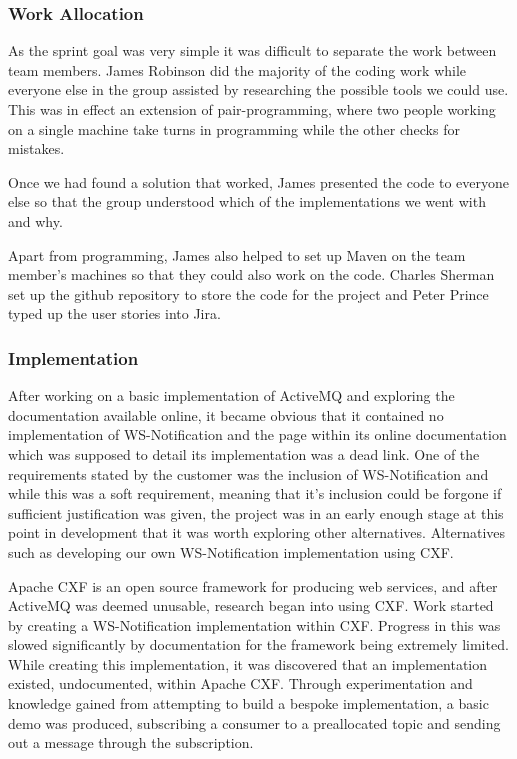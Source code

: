 \documentclass[a4paper, 12pt]{article}
\begin{document}
\subsubsection{Work Allocation}

As the sprint goal was very simple it was difficult to separate the work between team members. James Robinson did the majority of the coding work while everyone else in the group assisted by researching the possible tools we could use. This was in effect an extension of pair-programming, where two people working on a single machine take turns in programming while the other checks for mistakes.

Once we had found a solution that worked, James presented the code to everyone else so that the group understood which of the implementations we went with and why.

Apart from programming, James also helped to set up Maven on the team member's machines so that they could also work on the code. Charles Sherman set up the github repository to store the code for the project and Peter Prince typed up the user stories into Jira.

\subsubsection{Implementation}

After working on a basic implementation of ActiveMQ and exploring the documentation available online, it became obvious that it contained no implementation of WS-Notification and the page within its online documentation which was supposed to detail its implementation was a dead link. One of the requirements stated by the customer was the inclusion of WS-Notification and while this was a soft requirement, meaning that it's inclusion could be forgone if sufficient justification was given, the project was in an early enough stage at this point in development that it was worth exploring other alternatives. Alternatives such as developing our own WS-Notification implementation using CXF.

Apache CXF is an open source framework for producing web services, and after ActiveMQ was deemed unusable, research began into using CXF. Work started by creating a WS-Notification implementation within CXF. Progress in this was slowed significantly by documentation for the framework being extremely limited. While creating this implementation, it was discovered that an implementation existed, undocumented, within Apache CXF. Through experimentation and knowledge gained from attempting to build a bespoke implementation, a basic demo was produced, subscribing a consumer to a preallocated topic and sending out a message through the subscription.
\end{document}
